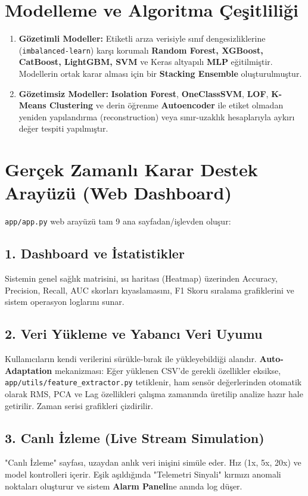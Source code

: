 \documentclass[conference,10pt]{IEEEtran}
\begin{document}
\section{Modelleme ve Algoritma Çeşitliliği}
\begin{enumerate}
    \item \textbf{Gözetimli Modeller:} Etiketli arıza verisiyle sınıf dengesizliklerine (\texttt{imbalanced-learn}) karşı korumalı \textbf{Random Forest, XGBoost, CatBoost, LightGBM, SVM} ve Keras altyapılı \textbf{MLP} eğitilmiştir. Modellerin ortak karar alması için bir \textbf{Stacking Ensemble} oluşturulmuştur.
    \item \textbf{Gözetimsiz Modeller:} \textbf{Isolation Forest}, \textbf{OneClassSVM}, \textbf{LOF}, \textbf{K-Means Clustering} ve derin öğrenme \textbf{Autoencoder} ile etiket olmadan yeniden yapılandırma (reconstruction) veya sınır-uzaklık hesaplarıyla aykırı değer tespiti yapılmıştır.
\end{enumerate}

\section{Gerçek Zamanlı Karar Destek Arayüzü (Web Dashboard)}
\texttt{app/app.py} web arayüzü tam 9 ana sayfadan/işlevden oluşur:

\subsection{1. Dashboard ve İstatistikler}
Sistemin genel sağlık matrisini, ısı haritası (Heatmap) üzerinden Accuracy, Precision, Recall, AUC skorları kıyaslamasını, F1 Skoru sıralama grafiklerini ve sistem operasyon loglarını sunar.
\subsection{2. Veri Yükleme ve Yabancı Veri Uyumu}
Kullanıcıların kendi verilerini sürükle-bırak ile yükleyebildiği alandır. \textbf{Auto-Adaptation} mekanizması: Eğer yüklenen CSV'de gerekli özellikler eksikse, \texttt{app/utils/feature\_extractor.py} tetiklenir, ham sensör değerlerinden otomatik olarak RMS, PCA ve Lag özellikleri çalışma zamanında üretilip analize hazır hale getirilir. Zaman serisi grafikleri çizdirilir.
\subsection{3. Canlı İzleme (Live Stream Simulation)}
"Canlı İzleme" sayfası, uzaydan anlık veri inişini simüle eder. Hız (1x, 5x, 20x) ve model kontrolleri içerir. Eşik aşıldığında "Telemetri Sinyali" kırmızı anomali noktaları oluşturur ve sistem \textbf{Alarm Paneli}ne anında log düşer.
\end{document}
